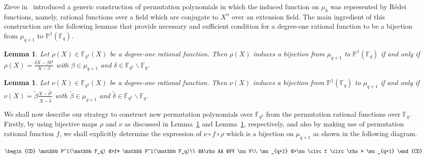 \documentclass[12pt]{amsart}
\newtheorem{lem}[thm]{Lemma}
\numberwithin{equation}{section}
\theoremstyle{definition}
\newcommand{\F}{\mathbb F}
\newcommand{\bP}{\mathbb P}
\begin{document}
Zieve in~\cite{Zieve2013} introduced a generic construction of permutation polynomials in which the induced function on $\mu_k$ was represented by R\' edei functions, namely, rational functions over a field which are conjugate to $X^n$ over an extension field. The main ingredient of this construction are the following lemmas that provide necessary and sufficient condition for a degree-one rational function to be a bijection from $\mu_{q+1}$ to $\bP^1(\F_q)$.
\begin{lem}\label{L21}
 Let $\rho(X) \in \F_{q^2}(X)$ be a degree-one rational function. Then $\rho(X)$ induces a bijection from $
\mu_{q+1}$ to $\bP^1(\F_q)$ if and only if $\displaystyle \rho(X)= \frac{\delta X -\beta \delta^q}{X-\beta}$ with $\beta \in \mu_{q+1}$ and $\delta \in \F_{q^2}\backslash \F_q$.
\end{lem}
\begin{lem}\label{L22}
 Let $\nu(X) \in \F_{q^2}(X)$ be a degree-one rational function. Then $\nu(X)$ induces a bijection from $\bP^1(\F_q)$ to $\mu_{q+1}$ if and only if $\displaystyle \nu(X)= \tilde{\beta}\frac{X -\tilde{\delta^q}}{X-\tilde{\delta}}$ with $\tilde{\beta} \in \mu_{q+1}$ and $\tilde{\delta} \in \F_{q^2}\backslash \F_q$.
\end{lem}
We shall now describe our strategy to construct new permutation polynomials over $\F_{q^2}$ from the permutation rational functions over $\F_q$. Firstly, by using bijective maps $\rho$ and $\nu$ as discussed in Lemma~\ref{L21} and Lemma~\ref{L22}, respectively, and also by making use of permutation rational function $f$, we shall explicitly determine the expression of $\nu \circ f \circ \rho$ which is a bijection on $\mu_{q+1}$ as shown in the following diagram.

$$\begin{CD}
\bP^1(\F_q) @>f>> \bP^1(\F_q)\\
 @A\rho AA   @VV \nu V\\
 \mu_{q+1}  @>\nu \circ f \circ
 \rho>>  \mu_{q+1}
\end{CD}$$
\end{document}
